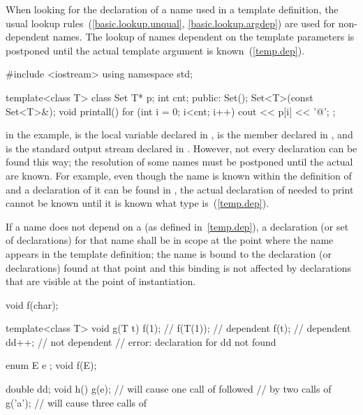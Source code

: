 \pnum
When looking for the declaration of a name used in a template definition,
the usual lookup rules~(\ref{basic.lookup.unqual}, \ref{basic.lookup.argdep})
are used for non-dependent names.
The lookup of names dependent on the template parameters
is postponed until the actual template argument is known~(\ref{temp.dep}).
\enterexample

\begin{codeblock}
#include <iostream>
using namespace std;

template<class T> class Set {
  T* p;
  int cnt;
public:
  Set();
  Set<T>(const Set<T>&);
  void printall() {
    for (int i = 0; i<cnt; i++)
      cout << p[i] << '@\textbackslash@n';
  }
};
\end{codeblock}

in the example,
is the local variable
declared in
,
is the member
declared in
,
and
is the standard output stream declared in
.
However, not every declaration can be found this way; the resolution of
some names must be postponed
until the actual
are known.
For example, even though the name
is known within the definition of
and a declaration of it can be found in
,
the actual declaration of
needed to print
cannot be known until it is known what type
is~(\ref{temp.dep}).
\exitexample

\pnum
If a name does not depend on a
(as defined in~\ref{temp.dep}), a declaration (or set of declarations) for that
name shall be in scope at the point where the name appears in the template
definition; the name is bound to the declaration (or declarations) found
at that point and this binding is not affected by declarations that are
visible at the point of instantiation.
\enterexample

\begin{codeblock}
void f(char);

template<class T> void g(T t) {
  f(1);             // 
  f(T(1));          // dependent
  f(t);             // dependent
  dd++;             // not dependent
                    // error: declaration for dd not found
}

enum E { e };
void f(E);

double dd;
void h() {
  g(e);             // will cause one call of  followed
                    // by two calls of 
  g('a');           // will cause three calls of 
}
\end{codeblock}
\exitexample

